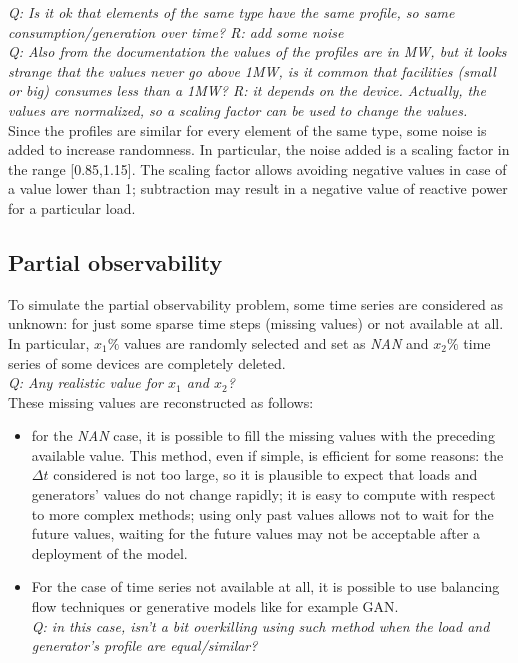 \emph{Q: Is it ok that elements of the same type have the same profile, so same consumption/generation over time? R: add some noise} \\
\emph{Q: Also from the documentation the values of the profiles are in MW, but it looks strange that the values never go above 1MW, is it common that facilities (small or big) consumes less than a 1MW? R: it depends on the device. Actually, the values are normalized, so a scaling factor can be used to change the values.} \\

Since the profiles are similar for every element of the same type, some noise is added to increase randomness. In particular, the noise added is a scaling factor in the range [0.85,1.15]. The scaling factor allows avoiding negative values in case of a value lower than 1; subtraction may result in a negative value of reactive power for a particular load. \\

\subsection{Partial observability}
To simulate the partial observability problem, some time series are considered as unknown: for just some sparse time steps (missing values) or not available at all. \\

In particular, $x_1\%$ values are randomly selected and set as \emph{NAN} and $x_2\%$ time series of some devices are completely deleted.\\
\emph{Q: Any realistic value for $x_1$ and $x_2$? \label{q:partialobvals}} \\

\noindent These missing values are reconstructed as follows:
\begin{itemize}
    \item for the \emph{NAN} case, it is possible to fill the missing values with the preceding available value. This method, even if simple, is efficient for some reasons: the $\Delta t$ considered is not too large, so it is plausible to expect that loads and generators' values do not change rapidly; it is easy to compute with respect to more complex methods; using only past values allows not to wait for the future values, waiting for the future values may not be acceptable after a deployment of the model.
    
    \item For the case of time series not available at all, it is possible to use balancing flow techniques or generative models like for example \gls{GAN}.\\
    \emph{Q: in this case, isn't a bit overkilling using such method when the load and generator's profile are equal/similar? \label{q:gan}}
\end{itemize}

